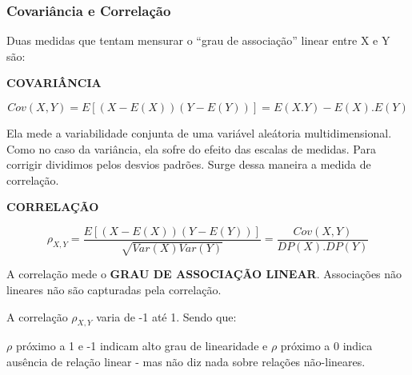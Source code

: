 \documentclass[
  letterpaper,
  DIV=11,
  numbers=noendperiod]{scrreprt}
\begin{document}
\subsubsection{Covariância e
Correlação}\label{covariuxe2ncia-e-correlauxe7uxe3o}

Duas medidas que tentam mensurar o ``grau de associação'' linear entre X
e Y são:

\textbf{COVARIÂNCIA}

\[Cov(X,Y)=E[(X-E(X))(Y-E(Y))]= E(X.Y)-E(X).E(Y)\]

Ela mede a variabilidade conjunta de uma variável aleátoria
multidimensional. Como no caso da variância, ela sofre do efeito das
escalas de medidas. Para corrigir dividimos pelos desvios padrões. Surge
dessa maneira a medida de correlação.

\textbf{CORRELAÇÃO}

\[\rho_{X,Y}=\frac{E[(X-E(X))(Y-E(Y))]}{\sqrt{Var(X)Var(Y)}}=\frac{Cov(X,Y)}{DP(X).DP(Y)}\]

\begin{tcolorbox}[enhanced jigsaw, titlerule=0mm, colback=white, coltitle=black, opacityback=0, breakable, colbacktitle=quarto-callout-warning-color!10!white, toprule=.15mm, colframe=quarto-callout-warning-color-frame, toptitle=1mm, bottomtitle=1mm, opacitybacktitle=0.6, left=2mm, arc=.35mm, rightrule=.15mm, bottomrule=.15mm, leftrule=.75mm, title=\textcolor{quarto-callout-warning-color}{\faExclamationTriangle}\hspace{0.5em}{Correlação}]

A correlação mede o \textbf{GRAU DE ASSOCIAÇÃO LINEAR}. Associações não
lineares não são capturadas pela correlação.

\end{tcolorbox}

\begin{tcolorbox}[enhanced jigsaw, titlerule=0mm, colback=white, coltitle=black, opacityback=0, breakable, colbacktitle=quarto-callout-note-color!10!white, toprule=.15mm, colframe=quarto-callout-note-color-frame, toptitle=1mm, bottomtitle=1mm, opacitybacktitle=0.6, left=2mm, arc=.35mm, rightrule=.15mm, bottomrule=.15mm, leftrule=.75mm, title=\textcolor{quarto-callout-note-color}{\faInfo}\hspace{0.5em}{Lendo a Correlação}]

A correlação \(\rho_{X,Y}\) varia de -1 até 1. Sendo que:

\(\rho\) próximo a 1 e -1 indicam alto grau de linearidade e \(\rho\)
próximo a 0 indica ausência de relação linear - mas não diz nada sobre
relações não-lineares.

\end{tcolorbox}
\end{document}
